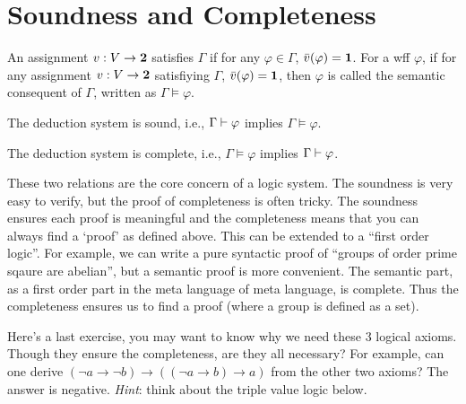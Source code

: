 \section{Soundness and Completeness}
An assignment $v:V\to \mathbf{2}$ satisfies $\Gamma$ if for any $\varphi\in\Gamma$,
$\bar{v}(\varphi)=\mathbf{1}$. For a wff $\varphi$, if for any assignment 
$v:V\to\mathbf{2}$ satisfiying $\Gamma$, $\bar{v}(\varphi)=\mathbf{1}$, then $\varphi$ is
called the semantic consequent of $\Gamma$, written as $\Gamma\models\varphi$.

\begin{theorem}
    The deduction system is sound, i.e., $\Gamma\vdash\varphi$ implies
    $\Gamma\models\varphi$. 
\end{theorem}

\begin{theorem}
    The deduction system is complete, i.e., $\Gamma\models\varphi$ implies
    $\Gamma\vdash\varphi$. 
\end{theorem}

These two relations are the core concern of a logic system. The soundness
is very easy to verify, but the proof of completeness is often tricky.
The soundness ensures each proof is meaningful and the completeness means
that you can always find a `proof' as defined above. This can be extended
to a ``first order logic''. For example, we can write a pure syntactic
proof of ``groups of order prime sqaure are abelian'', but a semantic
proof is more convenient. The semantic part, as a first order part in
the meta language of meta language, is complete. Thus the completeness
ensures us to find a proof (where a group is defined as a set). 

Here's a last exercise, you may want to know why we need these 3
logical axioms. Though they ensure the completeness, are they all
necessary? For example, can one derive 
$(\neg a\to\neg b)\to((\neg a\to b)\to a)$ from the other two axioms? 
The answer is negative. {\it Hint}: think about the triple value logic
below. 



